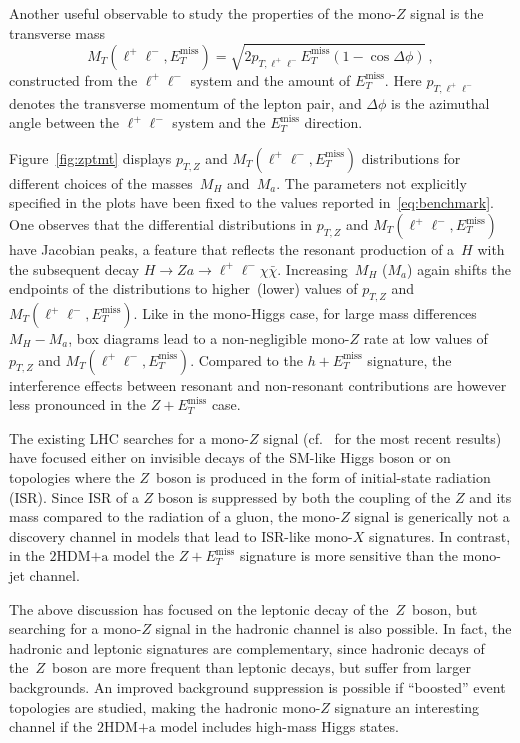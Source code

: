 \documentclass[a4paper, 11pt,notoc]{article}
\newcommand{\MET}{\ensuremath{E_T^\mathrm{miss}}\xspace}
\newcommand{\ma}{\ensuremath{M_{a}}\xspace}
\newcommand{\mH}{\ensuremath{M_{H}}\xspace}
\newcommand{\hdma}{\ensuremath{\textrm{2HDM+a}}\xspace}
\begin{document}
{\color{red} Another useful observable to study the properties of the mono-$Z$ signal is the transverse mass 
\begin{equation} \label{eq:transversemass}
M_T (\ell^+ \ell^-,\MET) = \sqrt{2 p_{T, \ell^+ \ell^-}  \MET  \left ( 1- \cos \Delta \phi \right )} \,,
\end{equation}
constructed from the $\ell^+ \ell^-$ system and the amount of $\MET$. Here $p_{T, \ell^+ \ell^-}$ denotes the transverse momentum of the lepton pair, and $\Delta \phi$ is the azimuthal angle between the $\ell^+ \ell^-$ system and the $\MET$ direction.}

Figure~\ref{fig:zptmt} displays  $p_{T,Z}$ and $M_T(\ell^+ \ell^-, \MET)$ distributions for different choices of the masses~$M_H$ and~$M_a$. The parameters not explicitly specified in the plots have been  fixed to the values reported in~\eqref{eq:benchmark}. One observes that the differential distributions in $p_{T,Z}$ and $M_T(\ell^+ \ell^-, \MET)$ have Jacobian peaks, a feature that  reflects the resonant production of a~$H$ with the subsequent decay $H \to Z a \to \ell^+ \ell^- \chi \bar \chi$.  Increasing~$\mH$ ($\ma$) again shifts the endpoints of the distributions to higher~(lower) values of $p_{T,Z}$ and $M_T(\ell^+ \ell^-, \MET)$. Like in the mono-Higgs case, for large mass differences $M_H - M_a$, box diagrams lead to a non-negligible mono-$Z$ rate at low values of $p_{T,Z}$ and $M_T(\ell^+ \ell^-, \MET)$. Compared to the $h + \MET$ signature, the interference effects between resonant and non-resonant contributions  are however  less pronounced  in  the $Z + \MET$  case. 

The existing LHC searches for a mono-$Z$ signal (cf.~\cite{Aaboud:2017bja,Sirunyan:2017qfc} for the most recent results) have  focused either on invisible decays of the SM-like Higgs boson or on topologies where the $Z$~boson is produced in the form of initial-state radiation (ISR). {\color{green} Since ISR of a $Z$ boson is suppressed by both the coupling of the $Z$ and its mass compared to the radiation of a gluon, the mono-$Z$ signal is generically not a discovery channel in models that lead to ISR-like mono-$X$ signatures.} {\color{red} In contrast, in the \hdma model the $Z+\MET$ signature is more sensitive than the mono-jet channel.}

The above discussion has focused on the leptonic decay of the~$Z$~boson, but searching for a mono-$Z$ signal in the hadronic channel is also possible. In fact, the hadronic and leptonic signatures  are complementary, since hadronic decays of the~$Z$~boson are more frequent than leptonic decays, but suffer from larger backgrounds. An improved background suppression is possible if ``boosted'' event topologies are studied, making the hadronic mono-$Z$ signature an interesting channel if the \hdma model includes high-mass Higgs states. 
\end{document}
